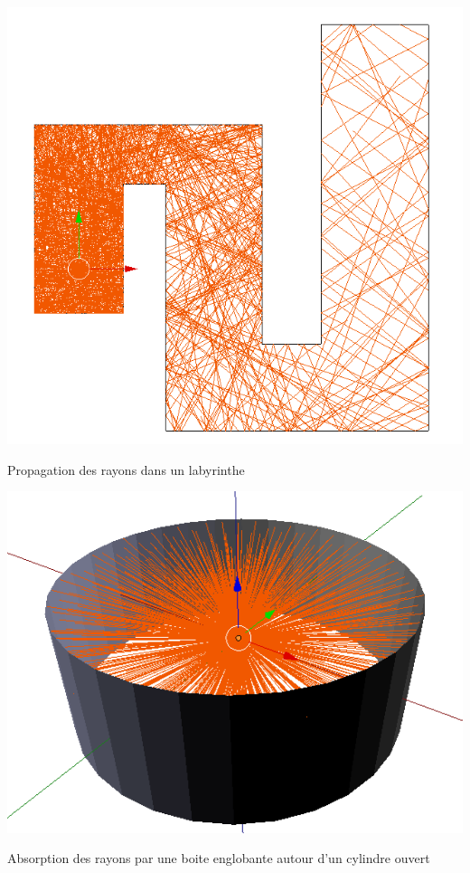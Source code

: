 \begin{figureth}
	\begin{subfigureth}{0.45\textwidth}
		\includegraphics[width=\linewidth]{images/test0}
		\caption{Propagation des rayons dans un labyrinthe}
		\label{test0}
	\end{subfigureth}
	\quad
	\begin{subfigureth}{0.45\textwidth}
		\includegraphics[width=\linewidth]{images/test0bis}
		\caption{Absorption des rayons par une boite englobante autour d'un cylindre ouvert}
		\label{test0bis}
	\end{subfigureth}
\end{figureth}


